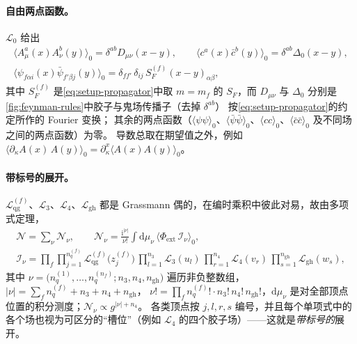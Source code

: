 \documentclass[UTF8,a4paper,11pt,fontset=fandol]{ctexart}
\theoremstyle{cplain}
\theoremstyle{cdefinition}
\theoremstyle{cremark}
\numberwithin{equation}{section}
\newcommand{\dd}{\mathrm{d}}                         %
\newcommand{\SF}{S_{F}}                              %
\newcommand{\ii}{\mathrm{i}}                        %
\begin{document}
\paragraph{自由两点函数。}
$\mathcal L_0$ 给出
\begin{equation}\label{eq:setup-free}
\begin{gathered}
\bigl\langle A^a_\mu(x)A^b_\nu(y)\bigr\rangle_0=\delta^{ab}D_{\mu\nu}(x-y),\qquad
\bigl\langle c^a(x)\bar c^b(y)\bigr\rangle_0=\delta^{ab}\Delta_0(x-y),\\
\bigl\langle\psi_{f\alpha i}(x)\bar\psi_{f'\beta j}(y)\bigr\rangle_0=\delta_{ff'}\,\delta_{ij}\,\SF^{(f)}(x-y)_{\alpha\beta},
\end{gathered}
\end{equation}
其中 $\SF^{(f)}$ 是\cref{eq:setup-propagator}中取 $m=m_f$ 的 $\SF$，而 $D_{\mu\nu}$ 与 $\Delta_0$ 分别是\cref{fig:feynman-rules}中胶子与鬼场传播子（去掉 $\delta^{ab}$）
按\cref{eq:setup-propagator}的约定所作的 Fourier 变换；
其余的两点函数（$\langle\psi\psi\rangle_0$、$\langle\bar\psi\bar\psi\rangle_0$、$\langle cc\rangle_0$、$\langle\bar c\bar c\rangle_0$ 及不同场之间的两点函数）为零。
导数总取在期望值之外，例如 $\langle\partial_\kappa A(x)\,A(y)\rangle_0=\partial^x_\kappa\langle A(x)A(y)\rangle_0$。

\paragraph{带标号的展开。}
$\mathcal L^{(f)}_{\mathrm{qg}}$、$\mathcal L_3$、$\mathcal L_4$、$\mathcal L_{\mathrm{gh}}$ 都是 Grassmann 偶的，在编时乘积中彼此对易，故由多项式定理，
\begin{equation}\label{eq:setup-Nnu}
\begin{gathered}
\mathcal N=\sum_{\nu}\mathcal N_\nu,\qquad
\mathcal N_\nu=\frac{\ii^{|\nu|}}{\nu!}\int\!\dd\mu_\nu\,\bigl\langle\Phi_{\mathrm{ext}}\,\mathcal I_\nu\bigr\rangle_0,\\
\mathcal I_\nu=\prod_{f}\prod_{j=1}^{n^{(f)}_q}\mathcal L^{(f)}_{\mathrm{qg}}\bigl(z^{(f)}_j\bigr)\,\prod_{l=1}^{n_3}\mathcal L_3(u_l)\,\prod_{r=1}^{n_4}\mathcal L_4(v_r)\,\prod_{s=1}^{n_{\mathrm{gh}}}\mathcal L_{\mathrm{gh}}(w_s),
\end{gathered}
\end{equation}
其中 $\nu=\bigl(n^{(1)}_q,\dots,n^{(n_f)}_q;n_3,n_4,n_{\mathrm{gh}}\bigr)$ 遍历非负整数组，$|\nu|=\sum_fn^{(f)}_q+n_3+n_4+n_{\mathrm{gh}}$，
$\nu!=\prod_fn^{(f)}_q!\cdot n_3!\,n_4!\,n_{\mathrm{gh}}!$，$\dd\mu_\nu$ 是对全部顶点位置的积分测度；$\mathcal N_\nu\propto g^{|\nu|+n_4}$。
各类顶点按 $j,l,r,s$ 编号，并且每个单项式中的各个场也视为可区分的“槽位”（例如 $\mathcal L_4$ 的四个胶子场）——这就是\emph{带标号的}展开。
\end{document}
